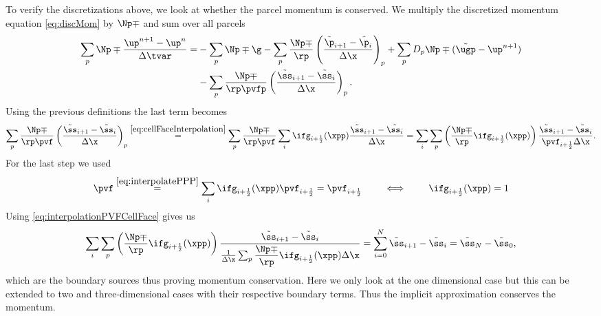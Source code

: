 To verify the discretizations above, we look at whether the parcel momentum is conserved. 
We multiply the discretized momentum equation \eqref{eq:discMom} by $\Np \mp$  and sum over all parcels
\begin{align*}
    \sum_p \Np \mp \dfrac{\up^{n+1}-\up^n}{\Delta \tvar} =& - \sum_p \Np \mp \g - \sum_p \dfrac{\Np \mp}{\rp} \left( \dfrac{\tilde{\p}_{i+1}- \tilde{\p}_i}{\Delta \x}\right)_p + \sum_p D_p \Np \mp (\tilde{\ugp} - \up^{n+1}) \\
    &- \sum_p \dfrac{\Np \mp}{\rp \pvfp} \left( \dfrac{\tilde{\ss}_{i+1}-\tilde{\ss}_i}{\Delta \x}\right)_p.
\end{align*}
Using the previous definitions the last term becomes
\begin{align*}
    \sum_p \dfrac{\Np \mp}{\rp \pvf} \left( \dfrac{\tilde{\ss}_{i+1}-\tilde{\ss}_i}{\Delta \x}\right)_p \stackrel{\eqref{eq:cellFaceInterpolation}}{=} \sum_p \dfrac{\Np \mp}{\rp \pvf} \sum_i \ifg_{i+\frac{1}{2}}(\xpp) \dfrac{\tilde{\ss}_{i+1}-\tilde{\ss_i}}{\Delta \x} = \sum_i \sum_p \left( \dfrac{\Np \mp}{\rp} \ifg_{i+\frac{1}{2}} ( \xpp)\right)\dfrac{\tilde{\ss}_{i+1}- \tilde{\ss}_i}{\pvf_{i+\frac{1}{2}} \Delta \x}.
\end{align*}
For the last step we used
\begin{equation*}
    \pvf \stackrel{\eqref{eq:interpolatePPP}}{=} \sum_{i}  \ifg_{i+\frac{1}{2}} (\xpp) \pvf_{i+\frac{1}{2}} = \pvf_{i+\frac{1}{2}} \qquad \iff \qquad \ifg_{i+\frac{1}{2}} (\xpp) = 1
\end{equation*}
Using \eqref{eq:interpolationPVFCellFace} gives us
\begin{align*}
    \sum_i \sum_p \left( \dfrac{\Np \mp}{\rp} \ifg_{i+\frac{1}{2}} ( \xpp)\right)\dfrac{\tilde{\ss}_{i+1}- \tilde{\ss}_i}{\frac{1}{\Delta \x}\sum_p \dfrac{\Np \mp}{\rp} \ifg_{i+\frac{1}{2}} ( \xpp) \Delta \x} %
    = \sum_{i=0}^{N} \tilde{\ss}_{i+1} - \tilde{\ss}_i = \tilde{\ss}_N - \tilde{\ss}_0,
\end{align*}
which are the boundary sources thus proving momentum conservation.
Here we only look at the one dimensional case but this can be extended to two and three-dimensional cases with their respective boundary terms. Thus the implicit approximation conserves the momentum.

